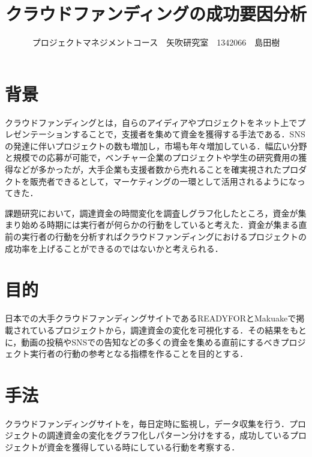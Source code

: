 \documentclass[uplatex,twocolumn,dvipdfmx]{jsarticle}
\title{\vspace{-5mm}\fontsize{14pt}{0pt}\selectfont クラウドファンディングの成功要因分析}
\author{\normalsize プロジェクトマネジメントコース　矢吹研究室　1342066　島田樹}
\date{}
\begin{document}
\fontsize{10.5pt}{\baselineskip}\selectfont
\maketitle





\section{背景}
クラウドファンディング\cite{wiki}とは，自らのアイディアやプロジェクトをネット上でプレゼンテーションすることで，支援者を集めて資金を獲得する手法である．SNSの発達に伴いプロジェクトの数も増加し，市場も年々増加している\cite{visualizing}．幅広い分野と規模での応募が可能で，ベンチャー企業のプロジェクトや学生の研究費用の獲得などが多かったが，大手企業も支援者数から売れることを確実視されたプロダクトを販売者できるとして，マーケティングの一環として活用されるようになってきた．

課題研究において，調達資金の時間変化を調査しグラフ化したところ，資金が集まり始める時期には実行者が何らかの行動をしていると考えた．資金が集まる直前の実行者の行動を分析すればクラウドファンディングにおけるプロジェクトの成功率を上げることができるのではないかと考えられる．


\section{目的}
日本での大手クラウドファンディングサイトであるREADYFORとMakuakeで掲載されているプロジェクトから，調達資金の変化を可視化する．その結果をもとに，動画の投稿やSNSでの告知などの多くの資金を集める直前にするべきプロジェクト実行者の行動の参考となる指標を作ることを目的とする．


\section{手法}
クラウドファンディングサイトを，毎日定時に監視し，データ収集を行う．プロジェクトの調達資金の変化をグラフ化しパターン分けをする，成功しているプロジェクトが資金を獲得している時にしている行動を考察する．
\end{document}
